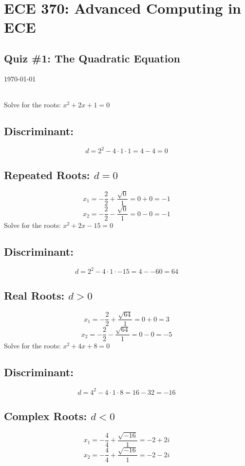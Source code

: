 \documentclass{exam}
\begin{document}
\section*{ECE 370: Advanced Computing in ECE}
\subsection*{Quiz \#1: The Quadratic Equation}
\today \\
\vspace{1mm}
\\
\vspace{3mm}

\begin{questions}
 \question Solve for the roots: \(x^2 +2x + 1 = 0\)

\subsection*{Discriminant:} 
\[d = 2^2 - 4\cdot 1 \cdot 1 = 4 - 4 = 0\]
 \subsection*{Repeated Roots: \(d = 0\)}
 \[x_1 = -\frac{2}{2} + \frac{\sqrt{0}}{1} = 0 + 0 = -1\]
 \[x_2 = -\frac{2}{2} - \frac{\sqrt{0}}{1} = 0 - 0 = -1\]
 \question Solve for the roots: \(x^2 +2x - 15 = 0\)

\subsection*{Discriminant:} 
\[d = 2^2 - 4\cdot 1 \cdot -15 = 4 - -60 = 64\]
 \subsection*{Real Roots: \(d > 0\)}
 \[x_1 = -\frac{2}{2} + \frac{\sqrt{64}}{1} = 0 + 0 = 3\]
 \[x_2 = -\frac{2}{2} - \frac{\sqrt{64}}{1} = 0 - 0 = -5\]
 \question Solve for the roots: \(x^2 +4x + 8 = 0\)

\subsection*{Discriminant:} 
\[d = 4^2 - 4\cdot 1 \cdot 8 = 16 - 32 = -16\]
 \subsection*{Complex Roots: \(d < 0\)}
 \[x_1 = -\frac{4}{4} + \frac{\sqrt{-16}}{1} = -2 + 2i\]
 \[x_2 = -\frac{4}{4} + \frac{\sqrt{-16}}{1} = -2 - 2i\]

\end{questions}
\end{document}
